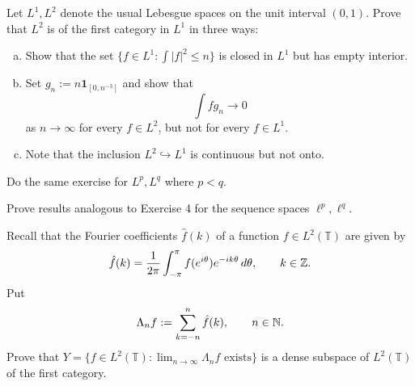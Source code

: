 \begin{exercise}[Rudin Ex.\ 2.4]
	Let $L^1, L^2$ denote the usual Lebesgue spaces on the unit interval $(0,1)$. Prove that $L^2$ is of the first category in $L^1$ in three ways:
	\begin{enumerate}[(a)]
		\item Show that the set $\{ f\in L^1 : \int |f|^2 \le n\}$ is closed in $L^1$ but has empty interior.
		\item Set $g_n := n \mathbf{1}_{[0, n^{-3}]}$ and show that
		\begin{equation*}
			\int fg_n \longrightarrow 0
		\end{equation*}
		as $n \to \infty$ for every $f\in L^2$, but not for every $f\in L^1$.
		\item Note that the inclusion $L^2 \hookrightarrow L^1$ is continuous but not onto.
	\end{enumerate}
	Do the same exercise for $L^p, L^q$ where $p<q$.
\end{exercise}

\begin{exercise}[Rudin Ex.\ 2.5]
	Prove results analogous to Exercise 4 for the sequence spaces $\ell^p, \ell^q$.
\end{exercise}

\begin{exercise}[Rudin Ex.\ 2.6]
	Recall that the Fourier coefficients $\hat{f}(k)$ of a function $f \in L^2(\mathbb{T})$ are given by
	\begin{equation*}
		\hat{f}(k) = \frac{1}{2\pi}\int_{-\pi}^\pi f(e^{i\theta}) e^{-ik\theta} \,d\theta, \qquad k \in \mathbb{Z}.
	\end{equation*}
	Put
	\begin{equation*}
		\Lambda_n f := \sum_{k=-n}^n \hat{f}(k), \qquad n \in \mathbb{N}.
	\end{equation*}
	Prove that $Y = \{f \in L^2(\mathbb{T}) : \lim_{n\to\infty} \Lambda_n f \text{ exists}\}$ is a dense subspace of $L^2(\mathbb{T})$ of the first category.
\end{exercise}

